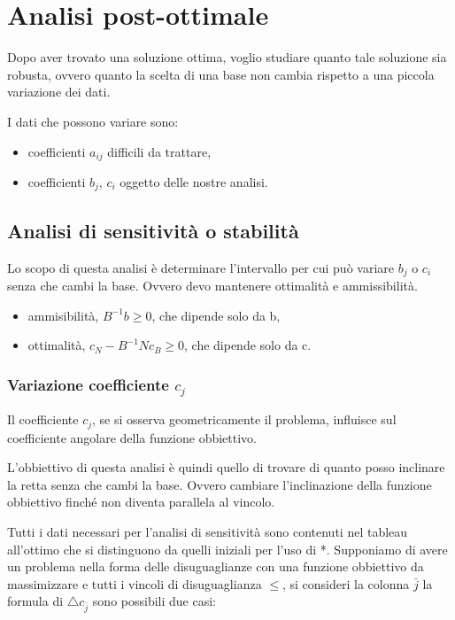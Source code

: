 \chapter{Analisi post-ottimale}
Dopo aver trovato una soluzione ottima, voglio studiare quanto tale soluzione sia robusta, ovvero quanto la scelta di una base non cambia rispetto a una piccola variazione dei dati.

I dati che possono variare sono:

\begin{itemize}
	\item coefficienti $a_{ij}$ difficili da trattare,
	\item coefficienti $b_j$, $c_i$ oggetto delle nostre analisi.
\end{itemize}

\section{Analisi di sensitività o stabilità}
Lo scopo di questa analisi è determinare l'intervallo per cui può variare $b_j$ o $c_i$ senza che cambi la base. Ovvero devo mantenere ottimalità e ammissibilità.

\begin{itemize}
	\item ammisibilità, $B^{-1}b \geq 0$, che dipende solo da b,
	\item ottimalità, $c_N - B^{-1}Nc_B \geq 0$, che dipende solo da c.
\end{itemize}

\subsection{Variazione coefficiente $c_j$}
Il coefficiente $c_j$, se si osserva geometricamente il problema, influisce sul coefficiente angolare della funzione obbiettivo. 

L'obbiettivo di questa analisi è quindi quello di trovare di quanto posso inclinare la retta senza che cambi la base. Ovvero cambiare l'inclinazione della funzione obbiettivo finché non diventa parallela al vincolo.


Tutti i dati necessari per l'analisi di sensitività sono contenuti nel tableau all'ottimo che si distinguono da quelli iniziali per l'uso di *.
Supponiamo di avere un problema nella forma delle disuguaglianze con una funzione obbiettivo da massimizzare e tutti i vincoli di disuguaglianza $\leq$, si consideri la colonna $\bar{j}$ la formula di $\triangle c_{\bar{j}}$ sono possibili due casi: 

